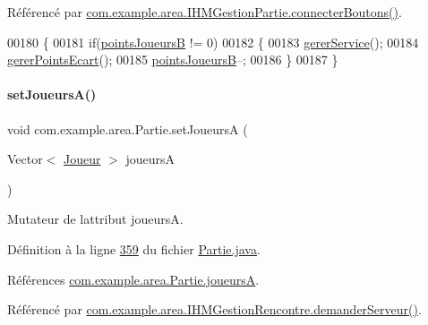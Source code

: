 Référencé par \hyperlink{_i_h_m_gestion_partie_8java_source_l00346}{com.\+example.\+area.\+I\+H\+M\+Gestion\+Partie.\+connecter\+Boutons()}.


\begin{DoxyCode}
00180     \{
00181         \textcolor{keywordflow}{if}(\hyperlink{classcom_1_1example_1_1area_1_1_partie_ae1ceb321b45437487124b1d886c7297c}{pointsJoueursB} != 0)
00182         \{
00183             \hyperlink{classcom_1_1example_1_1area_1_1_partie_a52c8e133b23468d4b2c4338a80c3763c}{gererService}();
00184             \hyperlink{classcom_1_1example_1_1area_1_1_partie_a2838da99f206d736a22f8a3f271365b2}{gererPointsEcart}();
00185             \hyperlink{classcom_1_1example_1_1area_1_1_partie_ae1ceb321b45437487124b1d886c7297c}{pointsJoueursB}--;
00186         \}
00187     \}
\end{DoxyCode}
\mbox{\label{classcom_1_1example_1_1area_1_1_partie_ace9c70bf0685d426f0d3fdb7e4f81f3f}} 
\paragraph{\texorpdfstring{set\+Joueurs\+A()}{setJoueursA()}}
{\footnotesize\ttfamily void com.\+example.\+area.\+Partie.\+set\+JoueursA (\begin{DoxyParamCaption}\item[{Vector$<$ \hyperlink{classcom_1_1example_1_1area_1_1_joueur}{Joueur} $>$}]{joueursA }\end{DoxyParamCaption})}



Mutateur de l\textquotesingle{}attribut joueursA. 



Définition à la ligne \hyperlink{_partie_8java_source_l00359}{359} du fichier \hyperlink{_partie_8java_source}{Partie.\+java}.



Références \hyperlink{_partie_8java_source_l00037}{com.\+example.\+area.\+Partie.\+joueursA}.



Référencé par \hyperlink{_i_h_m_gestion_rencontre_8java_source_l00222}{com.\+example.\+area.\+I\+H\+M\+Gestion\+Rencontre.\+demander\+Serveur()}.


